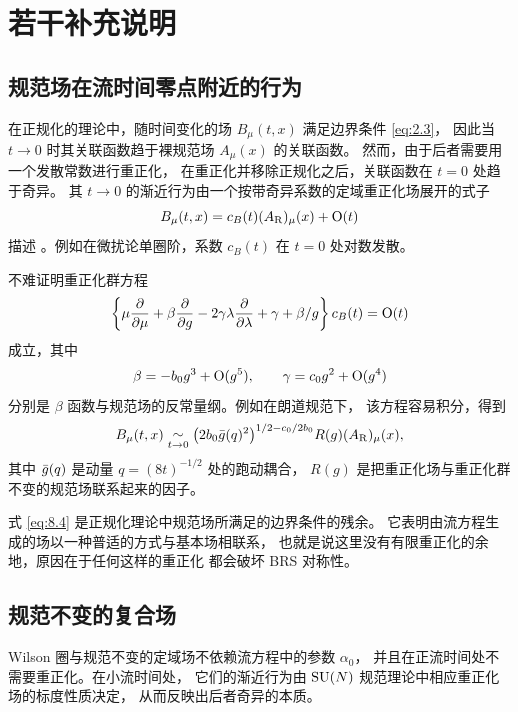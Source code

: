 \section{若干补充说明}\label{sec:misc}

\subsection{规范场在流时间零点附近的行为}

在正规化的理论中，随时间变化的场 $B_{\mu}(t,x)$ 满足边界条件 \eqref{eq:2.3}，
因此当 $t\to0$ 时其关联函数趋于裸规范场 $A_{\mu}(x)$ 的关联函数。
然而，由于后者需要用一个发散常数进行重正化，
在重正化并移除正规化之后，关联函数在 $t=0$ 处趋于奇异。
其 $t\to0$ 的渐近行为由一个按带奇异系数的定域重正化场展开的式子
\begin{equation}
   B_{\mu}(t,x)=c_B(t)(A_{\mathrm{R}})_{\mu}(x)+\mathrm{O}(t)
   \label{eq:8.1}
\end{equation}
描述 \cite{Symanzik}。例如在微扰论单圈阶，系数 $c_B(t)$ 在 $t=0$
处对数发散。

不难证明重正化群方程
\begin{equation}
   \left\{\mu{\partial\over\partial\mu}+\beta{\partial\over\partial g}
   -2\gamma\lambda{\partial\over\partial\lambda}
   +\gamma+\beta/g
   \right\}c_B(t)=\mathrm{O}(t)
   \label{eq:8.2}
\end{equation}
成立，其中
\begin{equation}
   \beta=-b_0g^3+\mathrm{O}(g^5),
   \qquad
   \gamma=c_0g^2+\mathrm{O}(g^4)
   \label{eq:8.3}
\end{equation}
分别是 $\beta$ 函数与规范场的反常量纲。例如在朗道规范下，
该方程容易积分，得到
\begin{equation}
   B_{\mu}(t,x)
   \mathrel{\mathop\sim_{t\to0}}
   \bigl(2b_0\bar{g}(q)^2\bigr)^{1/2-c_0/2b_0}
   R(g)(A_{\mathrm{R}})_{\mu}(x),
   \label{eq:8.4}
\end{equation}
其中 $\bar{g}(q)$ 是动量 $q=(8t)^{-1/2}$ 处的跑动耦合，
$R(g)$ 是把重正化场与重正化群不变的规范场联系起来的因子。

式 \eqref{eq:8.4} 是正规化理论中规范场所满足的边界条件的残余。
它表明由流方程生成的场以一种普适的方式与基本场相联系，
也就是说这里没有有限重正化的余地，原因在于任何这样的重正化
都会破坏 BRS 对称性。

\subsection{规范不变的复合场}

Wilson 圈与规范不变的定域场不依赖流方程中的参数 $\alpha_0$，
并且在正流时间处不需要重正化。在小流时间处，
它们的渐近行为由 $\mathrm{SU}(N)$ 规范理论中相应重正化场的标度性质决定，
从而反映出后者奇异的本质。

